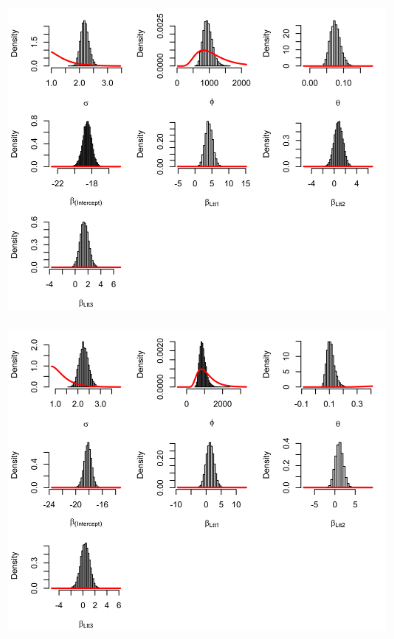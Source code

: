 \begin{appendices}
    \begin{figure}[H]
        \begin{center}
            \includegraphics[width = \linewidth, height = 80mm]{Prior and posterior density plots - All Cases.png}
        \end{center}
    \end{figure}

    \begin{figure}[H]
        \begin{center}
            \includegraphics[width = \linewidth, height = 80mm]{Prior and posterior density plots - Major 0.png}
        \end{center}
    \end{figure}


\end{appendices}
